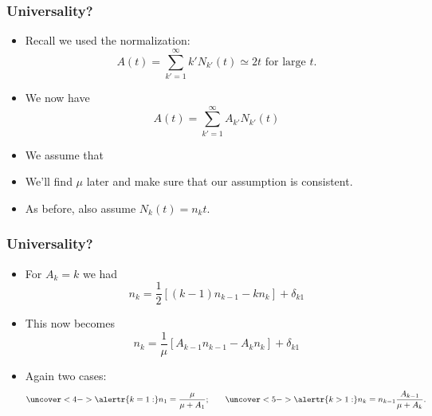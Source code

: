 \begin{frame}
  \frametitle{Universality?}

  \begin{block}{}
  \begin{itemize}
  \item<1->
    Recall we used the normalization:
    $$
    A(t) 
    = 
    \sum_{k'=1}^{\infty}
    k' N_{k'}(t)
    \simeq 2t
    \mbox{\ for large $t$.}
    $$
  \item<2->
    We now have 
    $$
    A(t) 
    = 
    \sum_{k'=1}^{\infty}
    A_{k'} N_{k'}(t)
    $$
  \item<4->
    We assume that 
  \item<5->
    We'll find $\mu$ later and make sure that our
    assumption is consistent.
  \item<6->
    As before, also assume $N_k(t) = n_k t$.
  \end{itemize}
  \end{block}

\end{frame}

\begin{frame}
  \frametitle{Universality?}

  \begin{block}{}
  \begin{itemize}
  \item<1->
    For $A_k = k$ we had 
    $$
    n_k
    =
    \frac{1}{2}
    \left[
      (k-1) n_{k-1} - k n_{k}
    \right]
    + \delta_{k1}
    $$
  \item<2->
    This now becomes
        $$
        n_k
    =
    \frac{1}{\mu}
    \left[
      A_{k-1} n_{k-1} - A_k n_{k}
    \right]
    + \delta_{k1}
    $$
  \item<4->
    Again two cases:
    $$
    \uncover<4->{
      \alertr{k=1:}
      n_1 = \frac{\mu}{\mu+A_1};
    }
    \qquad
    \uncover<5->{
      \alertr{k>1:}
      n_k
      =
      n_{k-1}\frac{A_{k-1}}{\mu + A_k}.
    }
    $$

  \end{itemize}
  \end{block}

\end{frame}


